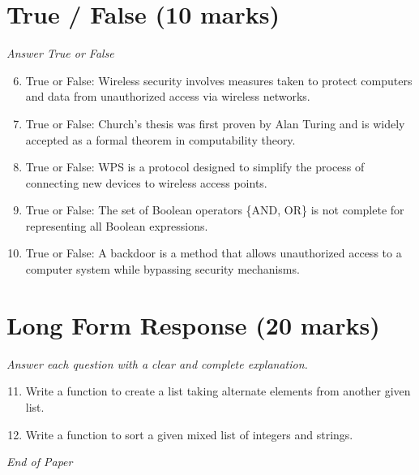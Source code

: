 \documentclass[12pt]{article}
\begin{document}
\section*{True / False (10 marks)}
\textit{Answer True or False}
\begin{enumerate}[label=\arabic*.]
\setcounter{enumi}{5}
\item True or False: Wireless security involves measures taken to protect computers and data from unauthorized access via wireless networks.
\item True or False: Church's thesis was first proven by Alan Turing and is widely accepted as a formal theorem in computability theory.
\item True or False: WPS is a protocol designed to simplify the process of connecting new devices to wireless access points.
\item True or False: The set of Boolean operators \{AND, OR\} is not complete for representing all Boolean expressions.
\item True or False: A backdoor is a method that allows unauthorized access to a computer system while bypassing security mechanisms.
\end{enumerate}

\section*{Long Form Response (20 marks)}
\textit{Answer each question with a clear and complete explanation.}
\begin{enumerate}[label=\arabic*.]
\setcounter{enumi}{10}
\item Write a function to create a list taking alternate elements from another given list.
\item Write a function to sort a given mixed list of integers and strings.
\end{enumerate}

\vfill
\noindent\textit{End of Paper}
\end{document}
